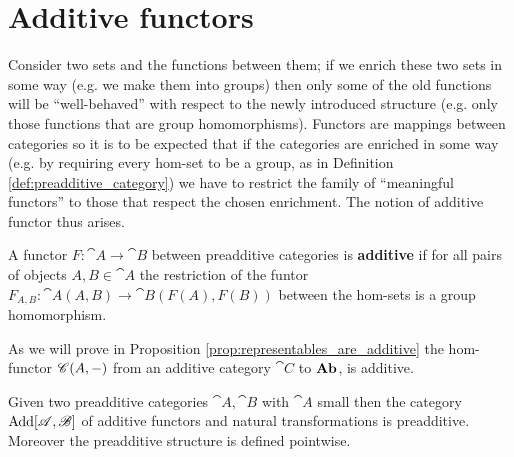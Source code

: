 \newpage
\section{Additive functors}
\label{sec:functors}
Consider two sets and the functions between them; if we enrich these two sets in some way (e.g. we make them into groups) then only some of the old functions will be ``well-behaved'' with respect to the newly introduced structure (e.g. only those functions that are group homomorphisms). Functors are mappings between categories so it is to be expected that if the categories are enriched in some way (e.g. by requiring every hom-set to be a group, as in Definition \ref{def:preadditive_category}) we have to restrict the family of ``meaningful functors'' to those that respect the chosen enrichment. The notion of additive functor thus arises.

\begin{definition}
  \label{def:additive_functor}
  A functor \(F\colon\cat{A}\to\cat{B}\) between preadditive categories is {\bf additive} if for all pairs of objects \(A,B\in\cat{A}\) the restriction of the funtor \(F_{A,B}\colon\cat{A}(A,B)\to\cat{B}(F(A),F(B))\) between the hom-sets is a group homomorphism.
\end{definition}

\begin{example}
  \label{ex:additive_functor}
  As we will prove in Proposition \ref{prop:representables_are_additive} the hom-functor \({\mathscr C}(A,-)\) from an additive category \(\cat{C}\) to \(\text{\normalfont\textbf{Ab}}\), is additive.
\end{example}

\begin{proposition}
  \label{prop:category_of_additive_functors}
  Given two preadditive categories \(\cat{A},\cat{B}\) with \(\cat{A}\) small then the category \(\text{\normalfont Add}[{\mathscr A}, {\mathscr B}]\) of additive functors and natural transformations is preadditive. Moreover the preadditive structure is defined pointwise.
\end{proposition}


